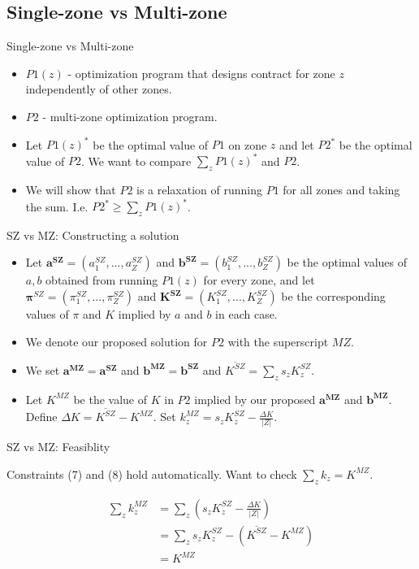 \documentclass{beamer}
\begin{document}
\subsection{Single-zone vs Multi-zone}
\begin{frame}{Single-zone vs Multi-zone}
  \begin{itemize}
    \setlength\itemsep{2em}
    \item $P1(z)$ - optimization program that designs contract for zone $z$ independently of other zones. 
    \item $P2$ - multi-zone optimization program. 
    \item Let $P1(z)^*$ be the optimal value of $P1$ on zone $z$ and let $P2^*$ be the optimal value of $P2$. We want to compare $\sum_z P1(z)^*$ and $P2$.
    \item We will show that $P2$ is a relaxation of running $P1$ for all zones and taking the sum. I.e. $P2^* \geq \sum_z P1(z)^*$.
  \end{itemize}
\end{frame}

\begin{frame}{SZ vs MZ: Constructing a solution}
    \begin{itemize}
        \setlength\itemsep{2em}
        \item Let $\mathbf{a^{SZ}} = (a^{SZ}_1,...,a^{SZ}_Z)$ and $\mathbf{b^{SZ}} = (b^{SZ}_1,...,b^{SZ}_Z)$ be the optimal values of $a,b$ obtained from running $P1(z)$ for every zone, and let $ {\pmb \pi^{SZ}} = (\pi^{SZ}_1,...,\pi^{SZ}_Z)$ and $\mathbf{K^{SZ}} = (K^{SZ}_1,...,K^{SZ}_Z)$ be the corresponding values of $\pi$ and $K$ implied by $a$ and $b$ in each case.
        \item We denote our proposed solution for $P2$ with the superscript $MZ$.
        \item We set $\mathbf{a^{MZ}} = \mathbf{a^{SZ}}$ and $\mathbf{b^{MZ}} = \mathbf{b^{SZ}}$ and $\overline{K^{SZ}} = \sum_z s_z K^{SZ}_z$.
        \item Let $K^{MZ}$ be the value of $K$ in $P2$ implied by our proposed $\mathbf{a^{MZ}}$ and $\mathbf{b^{MZ}}$. Define $\Delta K = \overline{K^{SZ}} - K^{MZ}$. Set $k_z^{MZ} = s_z K^{SZ}_z - \frac{\Delta K}{|Z|}$.
    \end{itemize}
    
\end{frame}

\begin{frame}{SZ vs MZ: Feasiblity}
  
   Constraints (7) and (8) hold automatically. Want to check $\sum_z k_z = K^{MZ}$.

    \begin{align*}
    \sum_z k^{MZ}_z &= \sum_z (s_z K^{SZ}_z - \frac{\Delta K}{|Z|} )\\
    &= \sum_z s_z K^{SZ}_z - (\overline{K^{SZ}} - K^{MZ}) \\
    &= K^{MZ}
    \end{align*}

    
\end{frame}
\end{document}
